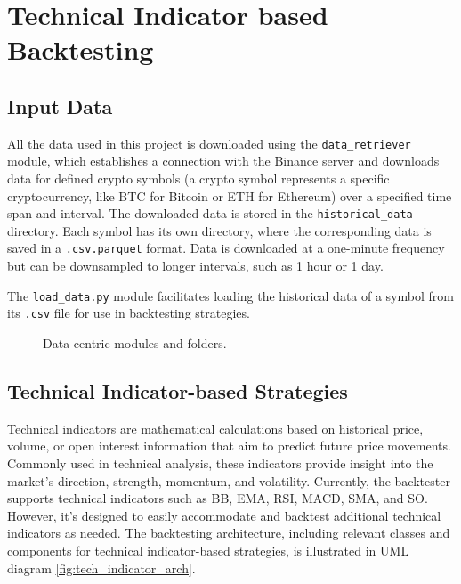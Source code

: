 \chapter{Technical Indicator based Backtesting}
\label{chap:technical_backtesting}






\section{Input Data}

 All the data used in this project is downloaded using the \texttt{data\_retriever} module, which establishes a connection with the Binance server
 and downloads data for defined crypto symbols (a crypto symbol represents a specific cryptocurrency,
like BTC for Bitcoin or ETH for Ethereum) over a specified time span and interval.
The downloaded data is stored in the \texttt{historical\_data} directory. Each symbol has its own directory, where the corresponding data is
saved in a \texttt{.csv.parquet} format.
Data is downloaded at a one-minute frequency but can be downsampled to longer intervals, such as 1 hour or 1 day.

The \texttt{load\_data.py} module facilitates loading the historical data of a symbol from its \texttt{.csv} file for use in backtesting strategies.

\begin{figure}[h]

\caption{Data-centric modules and folders.}\label{fig:inputdata}
\end{figure}

\section{Technical Indicator-based Strategies}

Technical indicators are mathematical calculations based on historical price, volume, or open interest information that aim to predict future price movements.
Commonly used in technical analysis, these indicators provide insight into the market's direction, strength, momentum, and volatility.
Currently, the backtester supports technical indicators such as BB, EMA, RSI, MACD, SMA, and SO. However, it's designed to easily
accommodate and backtest additional technical indicators as needed.
The backtesting architecture, including relevant classes and components for technical indicator-based strategies, is illustrated in UML diagram \ref{fig:tech_indicator_arch}.

